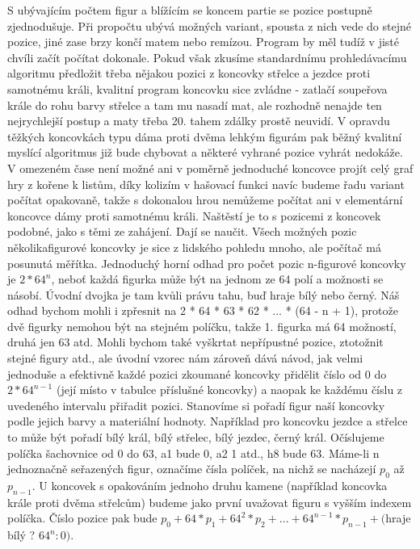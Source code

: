 \documentclass[11pt, titlepage]{article}
\begin{document}
S ubývajícím počtem figur a blížícím se koncem partie se pozice postupně zjednodušuje. Při propočtu ubývá možných variant, spousta z nich vede do stejné pozice, jiné zase brzy končí matem nebo remízou. Program by měl tudíž v jisté chvíli začít počítat dokonale. Pokud však zkusíme standardnímu prohledávacímu algoritmu předložit třeba nějakou pozici z koncovky střelce a jezdce proti samotnému králi, kvalitní program koncovku sice zvládne - zatlačí soupeřova krále do rohu barvy střelce a tam mu nasadí mat, ale rozhodně nenajde ten nejrychlejší postup a maty třeba 20. tahem zdálky prostě neuvidí. V opravdu těžkých koncovkách typu dáma proti dvěma lehkým figurám pak běžný kvalitní myslící algoritmus již bude chybovat a některé vyhrané pozice vyhrát nedokáže. V omezeném čase není možné ani v poměrně jednoduché koncovce projít celý graf hry z kořene k listům, díky kolizím v hašovací funkci navíc budeme řadu variant počítat opakovaně, takže s dokonalou hrou nemůžeme počítat ani v elementární koncovce dámy proti samotnému králi.
Naštěstí je to s pozicemi z koncovek podobné, jako s těmi ze zahájení. Dají se naučit. Všech možných pozic několikafigurové koncovky je sice z lidského pohledu mnoho, ale počítač má posunutá měřítka. Jednoduchý horní odhad pro počet pozic n-figurové koncovky je \begin{math}2 * 64^n\end{math}, neboť každá figurka může být na jednom ze 64 polí a možnosti se násobí. Úvodní dvojka je tam kvůli právu tahu, buď hraje bílý nebo černý. Náš odhad bychom mohli i zpřesnit na 2 * 64 * 63 * 62 * ... * (64 - n + 1), protože dvě figurky nemohou být na stejném políčku, takže 1. figurka má 64 možností, druhá jen 63 atd. Mohli bychom také vyškrtat nepřípustné pozice, ztotožnit stejné figury atd., ale úvodní vzorec nám zároveň dává návod, jak velmi jednoduše a efektivně každé pozici zkoumané koncovky přidělit číslo od 0 do \begin{math}2 * 64^{n-1}\end{math} (její místo v tabulce příslušné koncovky) a naopak ke každému číslu z uvedeného intervalu přiřadit pozici.
Stanovíme si pořadí figur naší koncovky podle jejich barvy a materiální hodnoty. Například pro koncovku jezdce a střelce to může být pořadí bílý král, bílý střelec, bílý jezdec, černý král. Očíslujeme políčka šachovnice od 0 do 63, a1 bude 0, a2 1 atd., h8 bude 63. Máme-li n jednoznačně seřazených figur, označíme čísla políček, na nichž se nacházejí \begin{math}p_0\end{math} až \begin{math}p_{n-1}\end{math}. U koncovek s opakováním jednoho druhu kamene (například koncovka krále proti dvěma střelcům) budeme jako první uvažovat figuru s vyšším indexem políčka. Číslo pozice pak bude \begin{math}p_0 + 64 * p_1 + 64^2 * p_2 + ... + 64^{n-1} * p_{n-1} + (\end{math}hraje bílý ? \begin{math}64^n : 0)\end{math}.
\end{document}
